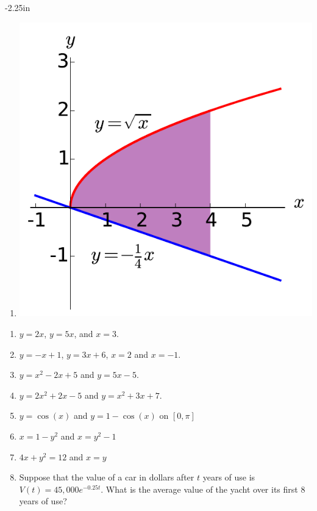 \begin{adjustwidth*}{}{-2.25in}
\begin{multicols*}{2}
\begin{enumerate}[1),resume]
\item \noindent
\begin{minipage}{\linewidth}
\includegraphics[scale=.35]{figs/4/4-7_Exb.pdf}
\end{minipage}
\end{enumerate}
\emtwo


\begin{enumerate}[1),start=15]
\item $y=2x$, $y=5x$, and $x= 3$.
\item $y=-x+1$, $y=3x+6$, $x=2$ and $x= -1$.
\item $y=x^2-2x+5$ and $y=5x-5$.
\item $y=2x^2+2x-5$ and $y=x^2+3x+7$.
\item $y = \cos(x)$ and $y = 1 - \cos(x)$ on $[0,\pi]$
\item $x = 1 - y^2$ and $x = y^2 - 1$
\item $4x + y^2 = 12$ and $x = y$

\item Suppose that the value of a car in dollars after $t$ years of use is $V(t) = 45,000e^{-0.25t}$. What is the average value of the yacht over its first $8$ years of use?


\end{enumerate}
\end{multicols*}
\end{adjustwidth*}
